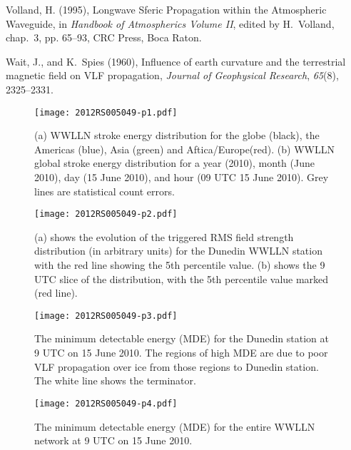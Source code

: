 \documentclass[draft,ras]{agutex}
\begin{document}
\begin{article}
\begin{thebibliography}{23}
Volland, H. (1995), {Longwave Sferic Propagation within the Atmospheric
  Waveguide}, in \textit{Handbook of Atmospherics Volume II}, edited by
  H.~Volland, chap.~3, pp. 65--93, CRC Press, Boca Raton.

Wait, J., and K.~Spies (1960), {Influence of earth curvature and the
  terrestrial magnetic field on VLF propagation}, \textit{Journal of
  Geophysical Research}, \textit{65}(8), 2325--2331.

\end{thebibliography}

\end{article}


\begin{figure}[ht!]
   \centering
\noindent\texttt{[image: 2012RS005049-p1.pdf]} 
   \caption{(a) WWLLN stroke energy distribution for the globe (black), the Americas (blue), Asia (green) and Aftica/Europe(red). (b) WWLLN global stroke energy distribution for a year (2010), month (June 2010), day (15 June 2010), and hour (09 UTC 15 June 2010). Grey lines are statistical count errors.}
   \label{2010_Energy}
\end{figure}

\begin{figure}[ht!]
   \centering
\noindent\texttt{[image: 2012RS005049-p2.pdf]} 
   \caption{(a) shows the evolution of the triggered RMS field strength distribution (in arbitrary units) for the Dunedin WWLLN station with the red line showing the 5th percentile value. (b) shows the 9 UTC slice of the distribution, with the 5th percentile value marked (red line).}
   \label{Threshold}
\end{figure}

\begin{figure}[ht!]
   \centering
\noindent\texttt{[image: 2012RS005049-p3.pdf]} 
   \caption{The minimum detectable energy (MDE) for the Dunedin station at 9 UTC on 15 June 2010. The regions of high MDE are due to poor VLF propagation over ice from those regions to Dunedin station. The white line shows the terminator.}
   \label{Threshold_Map}
\end{figure}

\begin{figure}[ht!]
   \centering
\noindent\texttt{[image: 2012RS005049-p4.pdf]} 
   \caption{The minimum detectable energy (MDE) for the entire WWLLN network at 9 UTC on 15 June 2010.}
   \label{Minimum_Energy}
\end{figure}
\end{document}
